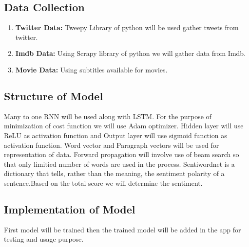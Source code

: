 \documentclass[12pt]{extarticle}
\begin{document}
\subsection{Data Collection}
\begin{enumerate}
\item \textbf{Twitter Data: }Tweepy Library of python will be used gather tweets from twitter. 
\item \textbf{Imdb Data: }Using Scrapy library of python we will gather data from Imdb.
\item \textbf{Movie Data: }Using subtitles available for movies.
\end{enumerate}
\subsection{Structure of Model}
Many to one RNN will be used along with LSTM. For the purpose of minimization of cost function we will use Adam optimizer.
Hidden layer will use ReLU as activation function and Output layer will use sigmoid function as activation function.
Word vector and Paragraph vectors will be used for representation of data. Forward propagation will involve use of beam search so that only limitied number of words are used in the process.
Sentiwordnet is a dictionary that tells, rather than the meaning, the sentiment polarity of a sentence.Based on the total score we will determine the sentiment.
\subsection{Implementation of Model}
First model will be trained then the trained model will be added in the app for testing and usage purpose.
\end{document}
